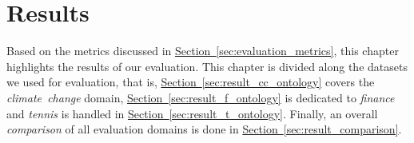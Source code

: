 \chapter{Results}\label{chap:results}
Based on the metrics discussed in \hyperref[sec:evaluation_metrics]{Section~\ref*{sec:evaluation_metrics}}, this chapter highlights the results of our evaluation.
This chapter is divided along the datasets we used for evaluation, that is, \hyperref[sec:result_cc_ontology]{Section~\ref*{sec:result_cc_ontology}} covers the \emph{climate~change} domain, \hyperref[sec:result_f_ontology]{Section~\ref*{sec:result_f_ontology}} is dedicated to \emph{finance} and \emph{tennis} is handled in \hyperref[sec:result_t_ontology]{Section~\ref*{sec:result_t_ontology}}. Finally, an overall \emph{comparison} of all evaluation domains is done in \hyperref[sec:result_comparison]{Section~\ref*{sec:result_comparison}}.











